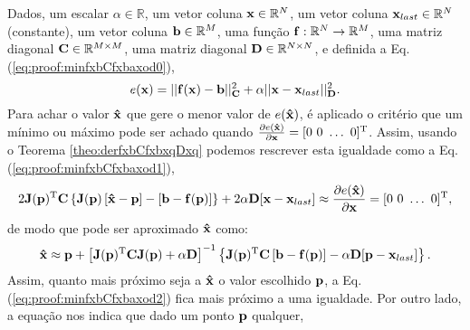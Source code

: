 \begin{myproofT}\label{proof:theo:minfxbCfxbaxod}
Dados,
um escalar $\alpha\in \mathbb{R}$,
um vetor coluna $\VECTOR{x}\in \mathbb{R}^N$, 
um vetor coluna $\VECTOR{x}_{last}\in \mathbb{R}^N$ (constante), 
um vetor coluna $\VECTOR{b}\in \mathbb{R}^M$,  
uma função $\VECTOR{f}:\mathbb{R}^{N} \rightarrow \mathbb{R}^{M}$, 
uma matriz diagonal $\MATRIX{C} \in \mathbb{R}^{M\times M}$,
uma matriz diagonal $\MATRIX{D} \in \mathbb{R}^{N\times N}$, e 
definida a Eq. (\ref{eq:proof:minfxbCfxbaxod0}),
\begin{equation}\label{eq:proof:minfxbCfxbaxod0}
e(\VECTOR{x})=||\VECTOR{f}(\VECTOR{x})-\VECTOR{b}||_{\MATRIX{C}}^2+\alpha||\VECTOR{x}-\VECTOR{x}_{last}||_{\MATRIX{D}}^2.
\end{equation}
Para achar o valor  $\VECTOR{\hat{x}}$ que gere o menor valor de $e(\VECTOR{\hat{x}})$, é aplicado
o critério que um mínimo ou máximo pode ser achado quando 
$\frac{\partial e(\VECTOR{\hat{x}})}{\partial \VECTOR{x} }=[0~ 0~ \hdots~ 0 ]^{\transpose}$.
Assim, usando o Teorema \ref{theo:derfxbCfxbxqDxq} podemos 
rescrever esta igualdade como a Eq. (\ref{eq:proof:minfxbCfxbaxod1}),
\begin{equation}\label{eq:proof:minfxbCfxbaxod1}
2 \MATRIX{J}(\VECTOR{p})^{\transpose}\MATRIX{C}\left\{\MATRIX{J}(\VECTOR{p})\left[\VECTOR{\hat{x}} - \VECTOR{p}\right]-\left[\VECTOR{b}-\VECTOR{f}(\VECTOR{p})\right]\right\} 
+2\alpha\MATRIX{D} [\VECTOR{x} -\VECTOR{x}_{last}] \approx
\frac{\partial e(\VECTOR{\hat{x}})}{\partial \VECTOR{x} }=[0~ 0~ \hdots~ 0 ]^{\transpose},
\end{equation}
de modo que pode ser aproximado $\VECTOR{\hat{x}}$ como:
\begin{equation}\label{eq:proof:minfxbCfxbaxod2}
\VECTOR{\hat{x}} \approx \VECTOR{p} +
\left[ \MATRIX{J}(\VECTOR{p})^{\transpose}\MATRIX{C} \MATRIX{J}(\VECTOR{p})+\alpha \MATRIX{D} \right]^{-1}
\left\{ \MATRIX{J}(\VECTOR{p})^{\transpose}\MATRIX{C} \left[\VECTOR{b}-\VECTOR{f}(\VECTOR{p})\right]-\alpha\MATRIX{D}[\VECTOR{p}-\VECTOR{x}_{last}]\right\}.
\end{equation}
Assim, quanto mais próximo seja a $\VECTOR{\hat{x}}$ o valor escolhido $\VECTOR{p}$, 
a Eq. (\ref{eq:proof:minfxbCfxbaxod2}) fica mais próximo a uma igualdade. Por outro lado,
a equação nos indica que dado um ponto  $\VECTOR{p}$ qualquer,

\end{myproofT}
